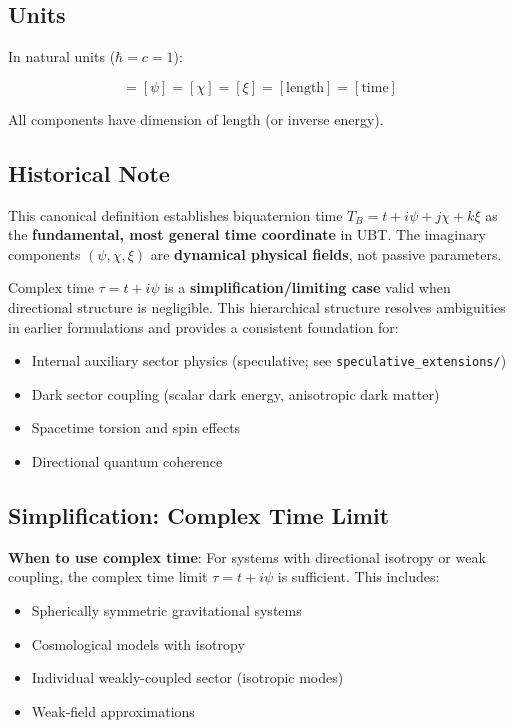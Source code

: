 \subsection{Units}

In natural units ($\hbar = c = 1$):

\begin{equation}
[t] = [\psi] = [\chi] = [\xi] = [\text{length}] = [\text{time}]
\end{equation}

All components have dimension of length (or inverse energy).

\subsection{Historical Note}

This canonical definition establishes biquaternion time $T_B = t + i\psi + j\chi + k\xi$ as the \textbf{fundamental, most general time coordinate} in UBT. The imaginary components $(\psi, \chi, \xi)$ are \textbf{dynamical physical fields}, not passive parameters. 

Complex time $\tau = t + i\psi$ is a \textbf{simplification/limiting case} valid when directional structure is negligible. This hierarchical structure resolves ambiguities in earlier formulations and provides a consistent foundation for:
\begin{itemize}
    \item Internal auxiliary sector physics (speculative; see \texttt{speculative\_extensions/})
    \item Dark sector coupling (scalar dark energy, anisotropic dark matter)
    \item Spacetime torsion and spin effects
    \item Directional quantum coherence
\end{itemize}

\subsection{Simplification: Complex Time Limit}

\textbf{When to use complex time}: For systems with directional isotropy or weak coupling, the complex time limit $\tau = t + i\psi$ is sufficient. This includes:

\begin{itemize}
    \item Spherically symmetric gravitational systems
    \item Cosmological models with isotropy
    \item Individual weakly-coupled sector (isotropic modes)
    \item Weak-field approximations
\end{itemize}

